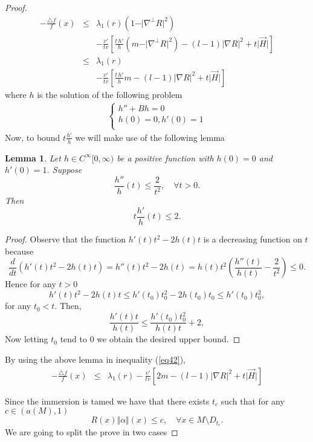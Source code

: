 \documentclass[a4paper]{amsart}
\newtheorem{lemma}[theorem]{Lemma}
\theoremstyle{definition}
\numberwithin{equation}{section}
\begin{document}
\begin{proof}
\begin{eqnarray}\label{eq42}-\frac{\triangle f}{f}(x)&\leq &\lambda_{1}(r)\left(1-\vert \nabla^\perp R\vert^2\right) \nonumber\\
&& -\frac{v'}{tv}\left[\frac{t\,h'}{h}(m-\vert \nabla^\perp R\vert^2)-(l-1)\vert \nabla R\vert^2+t\vert \vec H\vert\right]\nonumber\\
&\leq &\lambda_{1}(r)\\
&& -\frac{v'}{tv}\left[\frac{t\,h'}{h}m-(l-1)\vert \nabla R\vert^2+t\vert \vec H\vert\right]\nonumber
\end{eqnarray}
where $h$ is the solution of the following problem 
\begin{eqnarray}\label{eqh}
\left \{
\begin{array}{l}
h'' +Bh=0 \\
h(0)=0, h'(0)=1\\
\end{array} \right.
\end{eqnarray}
Now, to bound $t\frac{h'}{h}$ we will make use of the following lemma
\begin{lemma}
Let $h\in C^\infty [0,\infty)$ be a positive function with $h(0)=0$ and $h'(0)=1$. Suppose 
$$
 \frac{h''}{h}(t)\leq \frac{2}{t^2},\quad \forall t>0.
$$
Then
$$
t\frac{h'}{h}(t)\leq 2.
$$
\end{lemma}
\begin{proof}
Observe that the function $h'(t)t^2-2h(t)t$ is a decreasing function on $t$ because
\begin{equation}
\frac{d}{dt}\left(h'(t)t^2-2h(t)t\right)=h''(t)t^2-2h(t)=h(t)t^2\left(\frac{h''(t)}{h(t)}-\frac{2}{t^2}\right)\leq 0.
\end{equation}
Hence for any $t>0$
\begin{equation}
h'(t)t^2-2h(t)t\leq h'(t_0)t_0^2-2h(t_0)t_0\leq h'(t_0)t_0^2,
\end{equation}
for any $t_0<t$. Then,
\begin{equation}
\frac{h'(t)t}{h(t)}\leq \frac{h'(t_0)t_0^2}{h(t)t}+2,
\end{equation}
Now letting $t_0$ tend to $0$ we obtain the desired upper bound.
\end{proof}By using the above lemma in inequality (\ref{eq42}),
\begin{eqnarray}\label{eqfinal}-\frac{\triangle f}{f}(x)&\leq &\lambda_{1}(r)-\frac{v'}{tv}\left[2m-(l-1)\vert \nabla R\vert^2+t\vert \vec H\vert\right]
\end{eqnarray}

Since the immersion is tamed we have that there exists $t_c$ such that for any $c\in (a(M),1)$
\begin{equation}
R(x)\Vert \alpha\Vert(x)\leq c,\quad\forall x\in M\setminus D_{t_c}.
\end{equation} 
We are going to split the prove in two cases


\end{proof}
\end{document}
